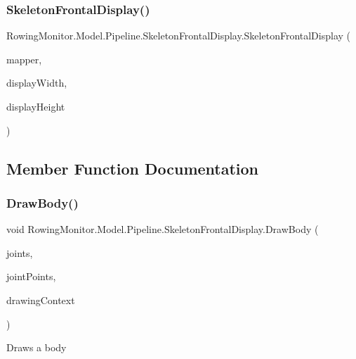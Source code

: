 \subsubsection{\texorpdfstring{Skeleton\+Frontal\+Display()}{SkeletonFrontalDisplay()}}
{\footnotesize\ttfamily Rowing\+Monitor.\+Model.\+Pipeline.\+Skeleton\+Frontal\+Display.\+Skeleton\+Frontal\+Display (\begin{DoxyParamCaption}\item[{Coordinate\+Mapper}]{mapper,  }\item[{int}]{display\+Width,  }\item[{int}]{display\+Height }\end{DoxyParamCaption})}



\subsection{Member Function Documentation}
\mbox{\label{class_rowing_monitor_1_1_model_1_1_pipeline_1_1_skeleton_frontal_display_a4f24762b003e94837e955d31f81c0499}} 
\subsubsection{\texorpdfstring{Draw\+Body()}{DrawBody()}}
{\footnotesize\ttfamily void Rowing\+Monitor.\+Model.\+Pipeline.\+Skeleton\+Frontal\+Display.\+Draw\+Body (\begin{DoxyParamCaption}\item[{I\+Read\+Only\+Dictionary$<$ Joint\+Type, Joint $>$}]{joints,  }\item[{I\+Dictionary$<$ Joint\+Type, Point $>$}]{joint\+Points,  }\item[{Drawing\+Context}]{drawing\+Context }\end{DoxyParamCaption})\hspace{0.3cm}{\ttfamily [protected]}}



Draws a body 



